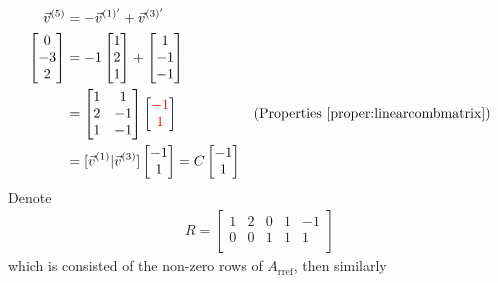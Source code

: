 \begin{align*}
\vec{v}^{(5)} &= -\vec{v}^{(1)'} + \vec{v}^{(3)'} \\
\begin{bmatrix}
0 \\
-3 \\
2
\end{bmatrix}
&= -1 
\begin{bmatrix}
1 \\
2 \\
1
\end{bmatrix}
+
\begin{bmatrix}
1 \\
-1 \\
-1
\end{bmatrix} \\
&=
\begin{bmatrix}
1 & 1 \\
2 & -1 \\
1 & -1
\end{bmatrix}
\begin{bmatrix}
\textcolor{red}{-1} \\
\textcolor{red}{1}
\end{bmatrix} & \text{(Properties \ref{proper:linearcombmatrix})} \\
&= [\vec{v}^{(1)}|\vec{v}^{(3)}]\begin{bmatrix}
-1 \\
1
\end{bmatrix} = C \begin{bmatrix}
-1 \\
1
\end{bmatrix}
\end{align*}
Denote
\begin{align*}
R = \begin{bmatrix}
1 & 2 & 0 & 1 & -1 \\
0 & 0 & 1 & 1 & 1 \\
\end{bmatrix}
\end{align*}
which is consisted of the non-zero rows of $A_{\text{rref}}$, then similarly
